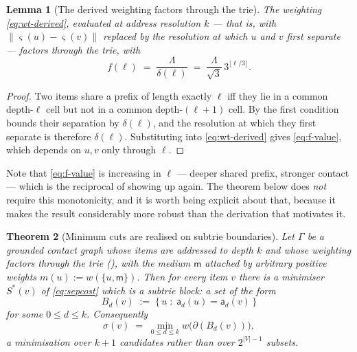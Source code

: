 \documentclass[11pt,twocolumn,a4paper]{article}
\theoremstyle{thmstyle}
\newtheorem{theorem}{Theorem}[section]
\newtheorem{lemma}[theorem]{Lemma}
\theoremstyle{definition}
\theoremstyle{remark}
\newcommand{\Gph}{\Gamma}
\newcommand{\V}{V}
\newcommand{\wt}{w}
\newcommand{\med}{\mathsf{m}}
\newcommand{\cut}{\partial}
\newcommand{\str}{\sigma}
\newcommand{\sse}{\varsigma}
\newcommand{\addr}{\mathsf{a}}
\newcommand{\abs}[1]{\lvert#1\rvert}
\newcommand{\norm}[1]{\lVert#1\rVert}
\begin{document}
\begin{lemma}[The derived weighting factors through the trie]
\label{lem:derived-factors}
The weighting \eqref{eq:wt-derived}, evaluated at address resolution
$k$ --- that is, with $\norm{\sse(u)-\sse(v)}$ replaced by the
resolution at which $u$ and $v$ first separate --- factors through the
trie, with
\begin{equation}
  f(\ell) \;=\; \frac{\Lambda}{\delta(\ell)}
  \;=\; \frac{\Lambda}{\sqrt3}\,3^{\lfloor \ell/3\rfloor}.
  \label{eq:f-value}
\end{equation}
\end{lemma}

\begin{proof}
Two items share a prefix of length exactly $\ell$ iff they lie in a
common depth-$\ell$ cell but not in a common depth-$(\ell+1)$ cell. By
 the first condition bounds their separation by
$\delta(\ell)$, and the resolution at which they first separate is
therefore $\delta(\ell)$. Substituting into \eqref{eq:wt-derived}
gives \eqref{eq:f-value}, which depends on $u,v$ only through $\ell$.
\end{proof}

Note that \eqref{eq:f-value} is increasing in $\ell$ --- deeper shared
prefix, stronger contact --- which is the reciprocal of
 showing up again. The theorem below does
\emph{not} require this monotonicity, and it is worth being explicit
about that, because it makes the result considerably more robust than
the derivation that motivates it.

\begin{theorem}[Minimum cuts are realised on subtrie boundaries]
\label{thm:subtrie-cut}
Let $\Gph$ be a grounded contact graph whose items are addressed to
depth $k$ and whose weighting factors through the trie
(), with the medium $\med$ attached by
arbitrary positive weights $m(u) := \wt(\{u,\med\})$. Then for every
item $v$ there is a minimiser $S^{*}(v)$ of \eqref{eq:sepcost} which is
a \emph{subtrie block}: a set of the form
\begin{equation}
  B_d(v) \;:=\; \bigl\{\, u \;:\; \addr_d(u) = \addr_d(v) \,\bigr\}
  \label{eq:subtrie-block}
\end{equation}
for some $0 \leq d \leq k$. Consequently
\begin{equation}
  \str(v) \;=\; \min_{0 \leq d \leq k} \wt\bigl(\cut(B_d(v))\bigr),
  \label{eq:str-over-depths}
\end{equation}
a minimisation over $k+1$ candidates rather than over $2^{\abs{\V}-1}$
subsets.
\end{theorem}
\end{document}

